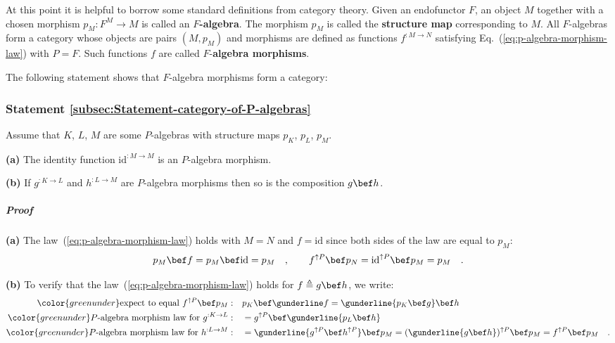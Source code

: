 At this point it is helpful to borrow some standard definitions from
category theory. Given an endofunctor $F$,
an object $M$ together with a chosen morphism $p_{M}:F^{M}\rightarrow M$
is called an $F$\textbf{-algebra}. The morphism $p_{M}$ is called
the \textbf{structure map} corresponding
to $M$.  All $F$-algebras form a category whose
objects are pairs $\left(M,p_{M}\right)$ and morphisms are defined
as functions $f^{:M\rightarrow N}$ satisfying Eq.~(\ref{eq:p-algebra-morphism-law})
with $P=F$. Such functions $f$ are called $F$-\textbf{algebra morphisms}.

The following statement shows that $F$-algebra morphisms form a category:

\subsubsection{Statement \label{subsec:Statement-category-of-P-algebras}\ref{subsec:Statement-category-of-P-algebras}}

Assume that $K$, $L$, $M$ are some $P$-algebras with structure
maps $p_{K}$, $p_{L}$, $p_{M}$.

\textbf{(a)} The identity function $\text{id}^{:M\rightarrow M}$
is an $P$-algebra morphism.

\textbf{(b)} If $g^{:K\rightarrow L}$ and $h^{:L\rightarrow M}$
are $P$-algebra morphisms then so is the composition $g\bef h$.

\subparagraph{Proof}

\textbf{(a)} The law~(\ref{eq:p-algebra-morphism-law}) holds with
$M=N$ and $f=\text{id}$ since both sides of the law are equal to
$p_{M}$:
\[
p_{M}\bef f=p_{M}\bef\text{id}=p_{M}\quad,\quad\quad f^{\uparrow P}\bef p_{N}=\text{id}^{\uparrow P}\bef p_{M}=p_{M}\quad.
\]

\textbf{(b)} To verify that the law~(\ref{eq:p-algebra-morphism-law})
holds for $f\triangleq g\bef h$, we write:
\begin{align*}
{\color{greenunder}\text{expect to equal }f^{\uparrow P}\bef p_{M}:}\quad & p_{K}\bef\gunderline f=\gunderline{p_{K}\bef g}\bef h\\
{\color{greenunder}P\text{-algebra morphism law for }g^{:K\rightarrow L}:}\quad & =g^{\uparrow P}\bef\gunderline{p_{L}\bef h}\\
{\color{greenunder}P\text{-algebra morphism law for }h^{:L\rightarrow M}:}\quad & =\gunderline{g^{\uparrow P}\bef h^{\uparrow P}}\bef p_{M}=(\gunderline{g\bef h})^{\uparrow P}\bef p_{M}=f^{\uparrow P}\bef p_{M}\quad.
\end{align*}

